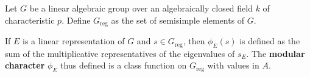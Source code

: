 Let $G$ be a linear algebraic group over an algebraically closed field $k$ of characteristic $p$. Define $G_{\text{reg}}$ as the set of semisimple elements of $G$.

If $E$ is a linear representation of $G$ and $s \in G_{\text{reg}}$, then $\phi_E(s)$ is defined as the sum of the multiplicative representatives of the eigenvalues of $s_E$. The \textbf{modular character} $\phi_E$ thus defined is a class function on $G_{\text{reg}}$ with values in $A$.
